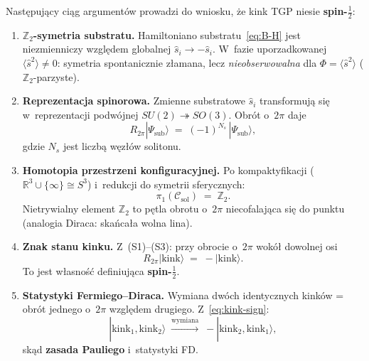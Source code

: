 \begin{proposition}%
\label{prop:kink-spin-half}
Nast\k{e}puj\k{a}cy ci\k{a}g argument\'ow prowadzi do wniosku,
\.ze kink TGP niesie \textbf{spin-$\tfrac{1}{2}$}:
\begin{enumerate}[(S1)]
  \item \textbf{$\mathbb{Z}_2$-symetria substratu.}
    Hamiltoniano substratu~\eqref{eq:B-H} jest niezmienniczy
    wzgl\k{e}dem globalnej $\hat{s}_i \to -\hat{s}_i$.
    W~fazie uporzadkowanej $\langle\hat{s}^2\rangle \neq 0$:
    symetria spontanicznie z\l{}amana, lecz \emph{nieobserwowalna}
    dla $\Phi = \langle\hat{s}^2\rangle$ ($\mathbb{Z}_2$-parzyste).

  \item \textbf{Reprezentacja spinorowa.}
    Zmienne substratowe $\hat{s}_i$ transformuj\k{a} si\k{e}
    w~reprezentacji podw\'ojnej $SU(2) \twoheadrightarrow SO(3)$.
    Obrót o~$2\pi$ daje
    \begin{equation}\label{eq:Z2-rotation}
      R_{2\pi}|\Psi_{\mathrm{sub}}\rangle
      \;=\; (-1)^{N_s}\,|\Psi_{\mathrm{sub}}\rangle,
    \end{equation}
    gdzie $N_s$ jest liczb\k{a} w\k{e}z\l{}\'ow solitonu.

  \item \textbf{Homotopia przestrzeni konfiguracyjnej.}
    Po kompaktyfikacji ($\mathbb{R}^3 \cup \{\infty\} \cong S^3$)
    i~redukcji do symetrii sferycznych:
    \begin{equation}\label{eq:pi1-config}
      \pi_1(\mathcal{C}_{\mathrm{sol}}) \;=\; \mathbb{Z}_2.
    \end{equation}
    Nietrywialny element $\mathbb{Z}_2$ to p\k{e}tla obrotu
    o~$2\pi$ niecofalaj\k{a}ca si\k{e} do punktu
    (analogia Diraca: ska\'nca\l{}a wolna lina).

  \item \textbf{Znak stanu kinku.}
    Z~(S1)--(S3): przy obrocie o~$2\pi$ wok\'o\l{} dowolnej osi
    \begin{equation}\label{eq:kink-sign}
      \boxed{
        R_{2\pi}|\mathrm{kink}\rangle \;=\; -|\mathrm{kink}\rangle.
      }
    \end{equation}
    To jest w\l{}asno\'s\'c definiuj\k{a}ca \textbf{spin-$\tfrac{1}{2}$}.

  \item \textbf{Statystyki Fermiego--Diraca.}
    Wymiana dw\'och identycznych kink\'ow
    = obrót jednego o~$2\pi$ wzgl\k{e}dem drugiego.
    Z~\eqref{eq:kink-sign}:
    \begin{equation}\label{eq:exchange-sign}
      |\mathrm{kink}_1,\mathrm{kink}_2\rangle
      \;\xrightarrow{\text{wymiana}}\;
      -|\mathrm{kink}_2,\mathrm{kink}_1\rangle,
    \end{equation}
    sk\k{a}d \textbf{zasada Pauliego} i~statystyki FD.
\end{enumerate}
\end{proposition}

